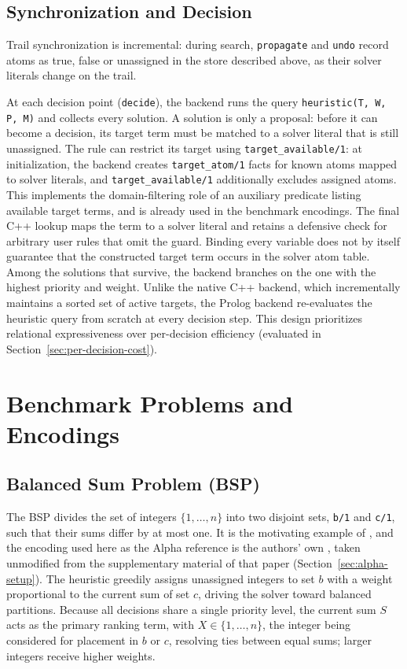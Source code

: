 \subsection{Synchronization and Decision}
\label{sec:decision-prolog}

Trail synchronization is incremental: during search, \texttt{propagate} and \texttt{undo} record atoms as true, false or unassigned in the store described above, as their solver literals change on the trail.

At each decision point (\texttt{decide}), the backend runs the query \texttt{heuristic(T, W, P, M)} and collects every solution. A solution is only a proposal: before it can become a decision, its target term must be matched to a solver literal that is still unassigned. The rule can restrict its target using \texttt{target\_available/1}: at initialization, the backend creates \texttt{target\_atom/1} facts for known atoms mapped to solver literals, and \texttt{target\_available/1} additionally excludes assigned atoms. This implements the domain-filtering role of an auxiliary predicate listing available target terms, and is already used in the benchmark encodings. The final C++ lookup maps the term to a solver literal and retains a defensive check for arbitrary user rules that omit the guard. Binding every variable does not by itself guarantee that the constructed target term occurs in the solver atom table. Among the solutions that survive, the backend branches on the one with the highest priority and weight. Unlike the native C++ backend, which incrementally maintains a sorted set of active targets, the Prolog backend re-evaluates the heuristic query from scratch at every decision step. This design prioritizes relational expressiveness over per-decision efficiency (evaluated in Section~\ref{sec:per-decision-cost}).

\section{Benchmark Problems and Encodings}
\label{sec:benchmarks}

\subsection{Balanced Sum Problem (BSP)}
\label{sec:bsp}

The BSP divides the set of integers $\{1,\ldots,n\}$ into two disjoint sets, \texttt{b/1} and \texttt{c/1}, such that their sums differ by at most one. It is the motivating example of \cite{comploi2023dynamicAggregates}, and the encoding used here as the Alpha reference is the authors' own , taken unmodified from the supplementary material of that paper (Section~\ref{sec:alpha-setup}). The heuristic greedily assigns unassigned integers to set $b$ with a weight proportional to the current sum of set $c$, driving the solver toward balanced partitions. Because all decisions share a single priority level, the current sum $S$ acts as the primary ranking term, with $X\in\{1,\ldots,n\}$, the integer being considered for placement in $b$ or $c$, resolving ties between equal sums; larger integers receive higher weights.

